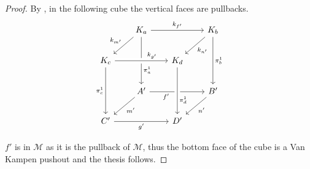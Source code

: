 \begin{proof}
    By , in the following cube the vertical faces are pullbacks.
    \[\begin{tikzcd}[row sep = 20, column sep = 20]
        & {K_a} && {K_b} \\
        {K_c} && {K_d} \\
        & {A'} && {B'} \\
        {C'} && {D'}
        \arrow["{k_{f'}}", from=1-2, to=1-4]
        \arrow["{k_{m'}}"', from=1-2, to=2-1]
        \arrow["{\pi_a^1}"{pos=0.7}, from=1-2, to=3-2]
        \arrow["{k_{n'}}", from=1-4, to=2-3]
        \arrow["{\pi_b^1}", from=1-4, to=3-4]
        \arrow["{k_{g'}}"{pos=0.7}, from=2-1, to=2-3, crossing over]
        \arrow["{\pi_c^1}"', from=2-1, to=4-1]
        \arrow["{f'}"'{pos=0.3}, from=3-2, to=3-4]
        \arrow["{\pi_d^1}"{pos=0.7}, from=2-3, to=4-3, crossing over]
        \arrow["{m'}", from=3-2, to=4-1]
        \arrow["{n'}", from=3-4, to=4-3]
        \arrow["{g'}"', from=4-1, to=4-3]
    \end{tikzcd}\]

	$f'$ is in $\mathcal{M}$ as it is the pullback of $\mathcal{M}$, thus the bottom face of the cube is a Van Kampen pushout and the thesis follows.

\end{proof}


